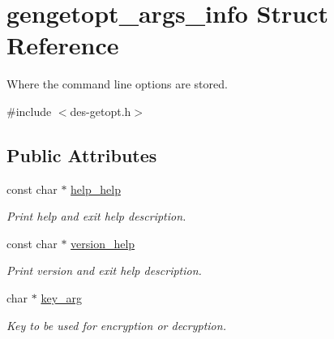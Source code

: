 \hypertarget{structgengetopt__args__info}{}\section{gengetopt\+\_\+args\+\_\+info Struct Reference}
\label{structgengetopt__args__info}


Where the command line options are stored.  




{\ttfamily \#include $<$des-\/getopt.\+h$>$}

\subsection*{Public Attributes}
\begin{DoxyCompactItemize}
\item 
\mbox{\label{structgengetopt__args__info_afb4efa68a6f43a4d112e9b96ffe89101}} 
const char $\ast$ \hyperlink{structgengetopt__args__info_afb4efa68a6f43a4d112e9b96ffe89101}{help\+\_\+help}
\begin{DoxyCompactList}\small\item\em Print help and exit help description. \end{DoxyCompactList}\item 
\mbox{\label{structgengetopt__args__info_adef454ea6f3ff4114ae5009e58360cfc}} 
const char $\ast$ \hyperlink{structgengetopt__args__info_adef454ea6f3ff4114ae5009e58360cfc}{version\+\_\+help}
\begin{DoxyCompactList}\small\item\em Print version and exit help description. \end{DoxyCompactList}\item 
\mbox{\label{structgengetopt__args__info_a9d2e2cfeae6c1b4644a9e539dd37b490}} 
char $\ast$ \hyperlink{structgengetopt__args__info_a9d2e2cfeae6c1b4644a9e539dd37b490}{key\+\_\+arg}
\begin{DoxyCompactList}\small\item\em Key to be used for encryption or decryption. \end{DoxyCompactList}\item 
\mbox{\label{structgengetopt__args__info_a46fe55fd04263db7ebf4d5afa09f696f}} 

\end{DoxyCompactItemize}
